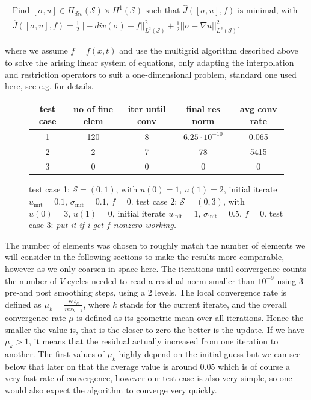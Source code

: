 \documentclass[../draft_1.tex]{subfiles}
\begin{document}
\begin{ceqn}
	\begin{equation}
	\begin{aligned}
	\text{Find } [\sigma, u] \in H_{div}(\mathcal{S}) \times H^1(\mathcal{S}) \text{ such that } \hat{J}([\sigma, u], f) \text{ is minimal, with } \\
\hat{J}([\sigma, u], f) = \frac{1}{2}|| - div(\sigma) - f ||_{L^2(\mathcal{S})}^2  + \frac{1}{2} || \sigma - \nabla u ||_{L^2(\mathcal{S})}^2.
	\end{aligned}
	\end{equation}
\end{ceqn}
where we assume $f = f(x,t)$ and use the multigrid algorithm described above to solve the arising linear system of equations, only adapting the interpolation and restriction operators to suit a one-dimensional problem, standard one used here, see e.g. \cite{briggs2000multigrid} for details.

\begin{figure}
	\begin{center}
		\begin{tabular}{||c | c | c | c | c ||} 
			\hline
			test case & no of fine elem & iter until conv & final res norm & avg conv rate \\ [0.5ex] 
			\hline\hline
			1 & 120 & 8 & $6.25 \cdot 10^{-10}$ &  0.065 \\ 
			\hline
			2 & 2 & 7 & 78 & 5415   \\
			\hline
			3 & 0 & 0 & 0 & 0  \\
			\hline
		\end{tabular}
	\end{center}
	\caption{test case 1: $\mathcal{S} = (0,1)$, with $u(0) = 1$, $u(1) = 2$, initial iterate $u_{\text{init}} = 0.1$, $\sigma_{\text{init}} = 0.1$, $f = 0$.
	test case 2: $\mathcal{S} = (0,3)$, with $u(0) = 3$, $u(1) = 0$, initial iterate $u_{\text{init}} = 1$, $\sigma_{\text{init}} = 0.5$, $f = 0$. test case 3: \textit{put it if i get $f$ nonzero working.} }
\end{figure}

The number of elements was chosen to roughly match the number of elements we will consider in the following sections to make the results more comparable, however as we only coarsen in space here. The iterations until convergence counts the number of $V$-cycles needed to read a residual norm smaller than $10^{-9}$ using 3 pre-and post smoothing steps, using a 2 levels. The local convergence rate is defined as $\mu_k = \frac{res_k}{res_{k-1}}$, where $k$ stands for the current iterate, and the overall convergence rate $\mu$ is defined as its geometric mean over all iterations. Hence the smaller the value is, that is the closer to zero the better is the update. If we have $\mu_k > 1$, it means that the residual actually increased from one iteration to another. The first values of $\mu_k$ highly depend on the initial guess but we can see below that later on that the average value is around $0.05$ which is of course a very fast rate of convergence, however our test case is also very simple, so one would also expect the algorithm to converge very quickly.
\end{document}
